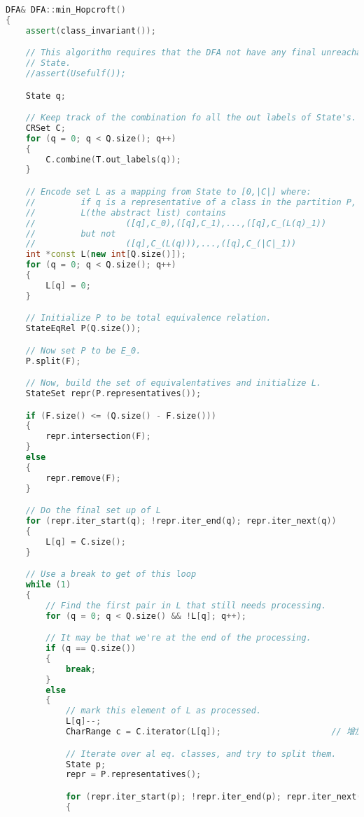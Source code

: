 \begin{lstlisting}[language=C++,label={lst:hop},caption={文件 min-hop.cpp}]
DFA& DFA::min_Hopcroft()
{
    assert(class_invariant());

    // This algorithm requires that the DFA not have any final unreachable
    // State.
    //assert(Usefulf());

    State q;

    // Keep track of the combination fo all the out labels of State's.
    CRSet C;
    for (q = 0; q < Q.size(); q++)
    {
        C.combine(T.out_labels(q));
    }

    // Encode set L as a mapping from State to [0,|C|] where:
    //         if q is a representative of a class in the partition P, then
    //         L(the abstract list) contains
    //                  ([q],C_0),([q],C_1),...,([q],C_(L(q)_1))
    //         but not
    //                  ([q],C_(L(q))),...,([q],C_(|C|_1))
    int *const L(new int[Q.size()]);
    for (q = 0; q < Q.size(); q++)
    {
        L[q] = 0;
    }

    // Initialize P to be total equivalence relation.
    StateEqRel P(Q.size());

    // Now set P to be E_0.
    P.split(F);

    // Now, build the set of equivalentatives and initialize L.
    StateSet repr(P.representatives());

    if (F.size() <= (Q.size() - F.size()))
    {
        repr.intersection(F);
    }
    else
    {
        repr.remove(F);
    }

    // Do the final set up of L
    for (repr.iter_start(q); !repr.iter_end(q); repr.iter_next(q))
    {
        L[q] = C.size();
    }

    // Use a break to get of this loop
    while (1)
    {
        // Find the first pair in L that still needs processing.
        for (q = 0; q < Q.size() && !L[q]; q++);

        // It may be that we're at the end of the processing.
        if (q == Q.size())
        {
            break;
        }
        else
        {
            // mark this element of L as processed.
            L[q]--;
            CharRange c = C.iterator(L[q]);                      // 增加

            // Iterate over al eq. classes, and try to split them.
            State p;
            repr = P.representatives();

            for (repr.iter_start(p); !repr.iter_end(p); repr.iter_next(p))
            {


\end{lstlisting}
